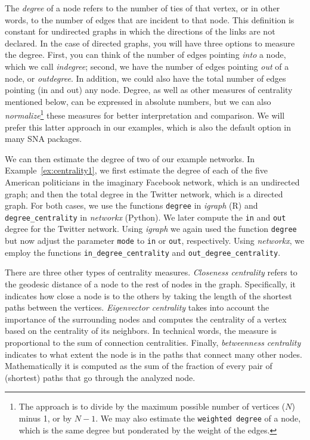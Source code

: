 The \emph{degree} of a node refers to the number of ties of that vertex, or in other words, to the number of edges that are incident to that node. This definition is constant for undirected graphs in which the directions of the links are not declared. In the case of directed graphs, you will have three options to measure the degree. First, you can think of the number of edges pointing \emph{into} a node, which we call \emph{indegree}; second, we have the number of edges pointing \emph{out} of a node, or \emph{outdegree}. In addition, we could also have the total number of edges pointing (in and out) any node. Degree, as well as other measures of centrality mentioned below, can be expressed in absolute numbers, but we can also \emph{normalize}\footnote{The approach is to divide by the maximum possible number of vertices ($N$) minus 1, or by $N-1$. We may also estimate the \texttt{weighted degree} of a node, which is the same degree but ponderated by the weight of the edges.}  these measures for better interpretation and comparison. We will prefer this latter approach in our examples, which is also the default option in many SNA packages.

We can then estimate the degree of two of our example networks. In Example~\ref{ex:centrality1}, we first estimate the degree of each of the five American politicians in the imaginary Facebook network, which is an undirected graph; and then the total degree in the Twitter network, which is a directed graph. For both cases, we use the functions \texttt{degree} in \emph{igraph} (R) and \texttt{degree\_centrality} in \emph{networkx} (Python). We later compute the \texttt{in} and \texttt{out} degree for the Twitter network. Using \emph{igraph} we again used the function \texttt{degree} but now adjust the parameter \texttt{mode} to \texttt{in} or \texttt{out}, respectively. Using \emph{networkx}, we employ the functions \texttt{in\_degree\_centrality} and \texttt{out\_degree\_centrality}.


There are three other types of centrality measures. \emph{Closeness centrality} refers to the geodesic distance of a node to the rest of nodes in the graph. Specifically, it indicates how close a node is to the others by taking the length of the shortest paths between the vertices. \emph{Eigenvector centrality} takes into account the importance of the surrounding nodes and computes the centrality of a vertex based on the centrality of its neighbors. In technical words, the measure is proportional to the sum of connection centralities. Finally, \emph{betweenness centrality} indicates to what extent the node is in the paths that connect many other nodes. Mathematically it is computed as the sum of the fraction of every pair of (shortest) paths that go through the analyzed node.

